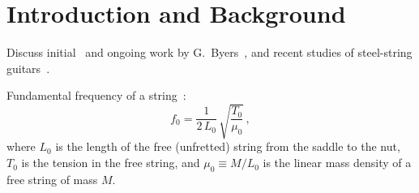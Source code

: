 %
%
%

 \section{Introduction and Background\label{sct:intro}}
Discuss initial~\cite{ref:byersweb} and ongoing work by G.\ Byers~\cite{ref:byers1996cgi}, and recent studies of steel-string guitars~\cite{ref:varieschi2010icf}.

Fundamental frequency of a string~\cite{ref:morse1981vas,ref:morse1981vsa}:
 \begin{equation} \label{eqn:f_0_def}
f_0 = \frac{1}{2\, L_0}\, \sqrt{\frac{T_0}{\mu_0}}\, ,
 \end{equation}
where $L_0$ is the length of the free (unfretted) string from the saddle to the nut, $T_0$ is the tension in the free string, and $\mu_0 \equiv M / L_0$ is the linear mass density of a free string of mass $M$.

